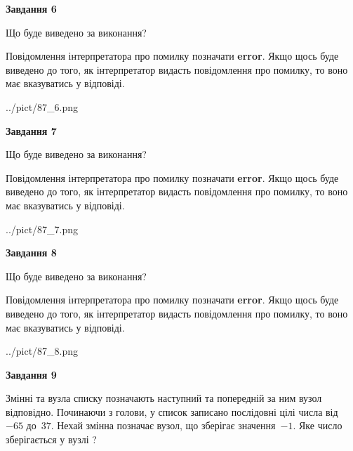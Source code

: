 \documentclass[12pt, ukrainian]{article}
\begin{document}
{\begin {large}
{\begin {center}\textbf{Завдання 6}\end {center}}\par
Що буде виведено за виконання?

Повідомлення інтерпретатора про помилку позначати \textbf{error}.
Якщо щось буде виведено до того, як інтерпретатор видасть повідомлення про помилку, 
то воно має вказуватись у відповіді. \par


\begin{center}
	{../pict/87_6.png}
\end{center}
\newpage

{\begin {center}\textbf{Завдання 7}\end {center}}\par
Що буде виведено за виконання?

Повідомлення інтерпретатора про помилку позначати \textbf{error}.
Якщо щось буде виведено до того, як інтерпретатор видасть повідомлення про помилку, 
то воно має вказуватись у відповіді. \par


\begin{center}
	{../pict/87_7.png}
\end{center}
\newpage

{\begin {center}\textbf{Завдання 8}\end {center}}\par
Що буде виведено за виконання?

Повідомлення інтерпретатора про помилку позначати \textbf{error}.
Якщо щось буде виведено до того, як інтерпретатор видасть повідомлення про помилку, 
то воно має вказуватись у відповіді. \par


\begin{center}
	{../pict/87_8.png}
\end{center}
\newpage

{\begin {center}\textbf{Завдання 9}\end {center}}\par
Змінні  та  вузла списку позначають наступний та попередній за ним вузол відповідно. Починаючи з голови, у список записано послідовні цілі числа від~$-65$ до~$37$. Нехай змінна  позначає вузол, що зберігає значення~$-1$.
Яке число зберігається у вузлі  ?\par
\newpage


\end{large}}
\end{document}
